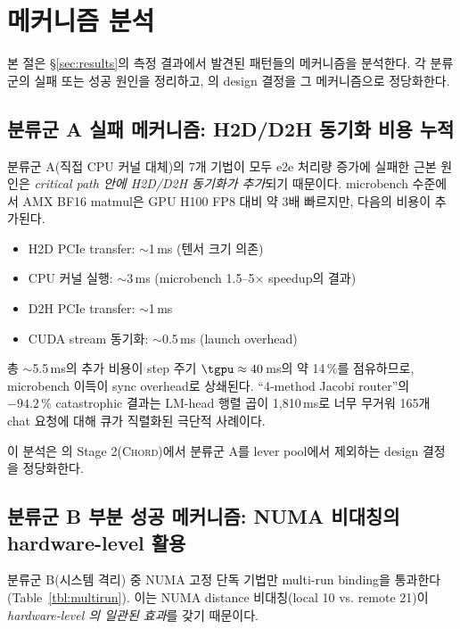 
\section{메커니즘 분석}
\label{sec:mechanism}

본 절은 \S\ref{sec:results}의 측정 결과에서 발견된 패턴들의 메커니즘을 분석한다.
각 분류군의 실패 또는 성공 원인을 정리하고, \algname 의 design 결정을 그 메커니즘으로 정당화한다.



\subsection{분류군 A 실패 메커니즘: H2D/D2H 동기화 비용 누적}

분류군 A(직접 CPU 커널 대체)의 7개 기법이 모두 e2e 처리량 증가에 실패한 근본 원인은 \emph{critical path 안에 H2D/D2H 동기화가 추가}되기 때문이다.
microbench 수준에서 AMX BF16 matmul은 GPU H100 FP8 대비 약 3배 빠르지만, 다음의 비용이 추가된다.

\begin{itemize}
  \item H2D PCIe transfer: $\sim$1\,ms (텐서 크기 의존)
  \item CPU 커널 실행: $\sim$3\,ms (microbench 1.5--5$\times$ speedup의 결과)
  \item D2H PCIe transfer: $\sim$1\,ms
  \item CUDA stream 동기화: $\sim$0.5\,ms (launch overhead)
\end{itemize}

총 $\sim$5.5\,ms의 추가 비용이 step 주기 $\tgpu \approx 40$\,ms의 약 14\,\%를 점유하므로, microbench 이득이 sync overhead로 상쇄된다.
``4-method Jacobi router''의 $-94.2\,\%$ catastrophic 결과는 LM-head 행렬 곱이 1{,}810\,ms로 너무 무거워 165개 chat 요청에 대해 큐가 직렬화된 극단적 사례이다.

이 분석은 \algname 의 Stage 2(\textsc{Chord})에서 분류군 A를 lever pool에서 제외하는 design 결정을 정당화한다.

\subsection{분류군 B 부분 성공 메커니즘: NUMA 비대칭의 hardware-level 활용}

분류군 B(시스템 격리) 중 NUMA 고정 단독 기법만 multi-run binding을 통과한다(Table~\ref{tbl:multirun}).
이는 NUMA distance 비대칭(local 10 vs. remote 21)이 \emph{hardware-level 의 일관된 효과}를 갖기 때문이다.

